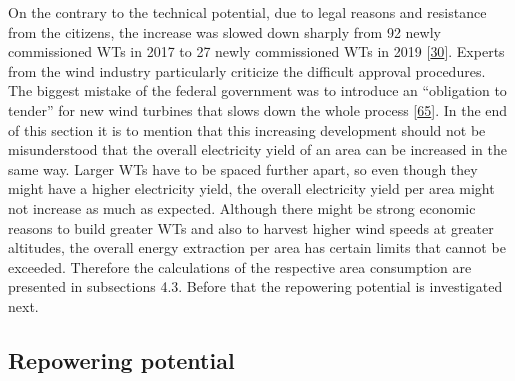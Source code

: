 \documentclass[a4paper,11pt]{article}
\begin{document}
On the contrary to the technical potential, due to legal reasons and resistance from the citizens, the increase was slowed down sharply from 92 newly commissioned WTs in 2017 to 27 newly commissioned WTs in 2019 {[}\protect\hyperlink{ref-EnergieagenturRheinlandPfalz.2019}{30}{]}. Experts from the wind industry particularly criticize the difficult approval procedures. The biggest mistake of the federal government was to introduce an ``obligation to tender'' for new wind turbines that slows down the whole process {[}\protect\hyperlink{ref-NickSchader.2021}{65}{]}. In the end of this section it is to mention that this increasing development should not be misunderstood that the overall electricity yield of an area can be increased in the same way. Larger WTs have to be spaced further apart, so even though they might have a higher electricity yield, the overall electricity yield per area might not increase as much as expected. Although there might be strong economic reasons to build greater WTs and also to harvest higher wind speeds at greater altitudes, the overall energy extraction per area has certain limits that cannot be exceeded. Therefore the calculations of the respective area consumption are presented in subsections 4.3. Before that the repowering potential is investigated next.

\hypertarget{repowering-potential}{%
\subsection{Repowering potential}\label{repowering-potential}}
\end{document}
